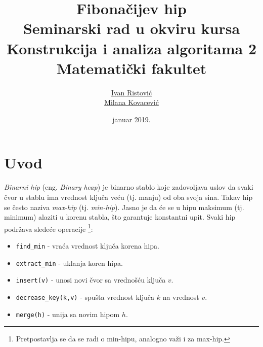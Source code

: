 \documentclass[a4paper]{article}
\theoremstyle{plain}
\theoremstyle{definition}
\begin{document}
\title{Fibona\v{c}ijev hip\\ \small{Seminarski rad u okviru kursa\\Konstrukcija i analiza algoritama 2\\ Matematički fakultet}}

\author{\href{mailto:ivan_ristovic@math.rs}{Ivan Ristovi\'c}\\\href{mailto:mi14042@matf.bg.ac.rs}{Milana Kovacevi\'c{}}}
\date{januar 2019.}

\maketitle


\tableofcontents

\newpage

\section{Uvod}
\label{sec:Uvod}

\emph{Binarni hip} (eng. \emph{Binary heap}) \cite{Heap} je binarno stablo koje zadovoljava uslov da svaki \v{c}vor u stablu ima vrednost klju\v{c}a ve\'c{}u (tj. manju) od oba svoja sina. Takav hip se \v{c}esto naziva \emph{max-hip} (tj. \emph{min-hip}). Jasno je da \'c{}e se u hipu maksimum (tj. minimum) alaziti u korenu stabla, \v{s}to garantuje konstantni upit. Svaki hip podr\v{z}ava slede\'c{}e operacije \footnote{Pretpostavlja se da se radi o min-hipu, analogno va\v{z}i i za max-hip.}:
\begin{itemize}
    \item \texttt{find\_min} - vra\'c{}a vrednost klju\v{c}a korena hipa.
    \item \texttt{extract\_min} - uklanja koren hipa.
    \item \texttt{insert(v)} - unosi novi \v{c}vor sa vredno\v{s}\'c{}u klju\v{c}a $v$.
    \item \texttt{decrease\_key(k,v)} - spu\v{s}ta vrednost klju\v{c}a $k$ na vrednost $v$.
    \item \texttt{merge(h)} - unija sa novim hipom $h$.
\end{itemize}
\end{document}

